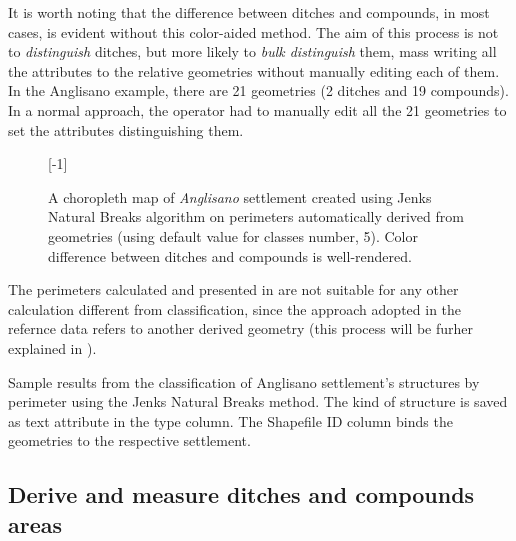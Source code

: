             It is worth noting that the difference between ditches and compounds, in most cases, is evident without this color-aided method. The aim of this process is not to \emph{distinguish} ditches, but more likely to \emph{bulk distinguish} them, mass writing all the attributes to the relative geometries without manually editing each of them. In the Anglisano example, there are 21 geometries (2 ditches and 19 compounds). In a normal approach, the operator had to manually edit all the 21 geometries to set the attributes distinguishing them.

            \begin{figure}[H]
                \centering
                \scalebox{1}[-1]{ %
                    \begin{tikzpicture}[x=1mm,y=1mm,scale=0.22]
                        
                    \end{tikzpicture}
                }
                \caption[A choropleth map of \emph{Anglisano} settlement using Jenks Natural Breaks]{A choropleth map of \emph{Anglisano} settlement created using Jenks Natural Breaks algorithm on perimeters automatically derived from geometries (using default value for classes number, 5). Color difference between ditches and compounds is well-rendered.}
                \label{fig:jenks-color}
            \end{figure}

            The perimeters calculated and presented in  are not suitable for any other calculation different from classification, since the approach adopted in the refernce data \cite{laterza} refers to another derived geometry (this process will be furher explained in ).

            \begin{table}[!htb]
                \centering
                
                \caption[Sample geometry classification results from Anglisano settlements using Jenk Natural Breaks method]{Sample results from the classification of Anglisano settlement's structures by perimeter using the Jenks Natural Breaks method. The kind of structure is saved as text attribute in the \textsf{type} column. The \textsf{Shapefile ID} column binds the geometries to the respective settlement.}
                \label{tab:jnb-results}
            \end{table}

            \pagebreak
        \subsection{Derive and measure ditches and compounds areas\label{sec:comp-area}}

